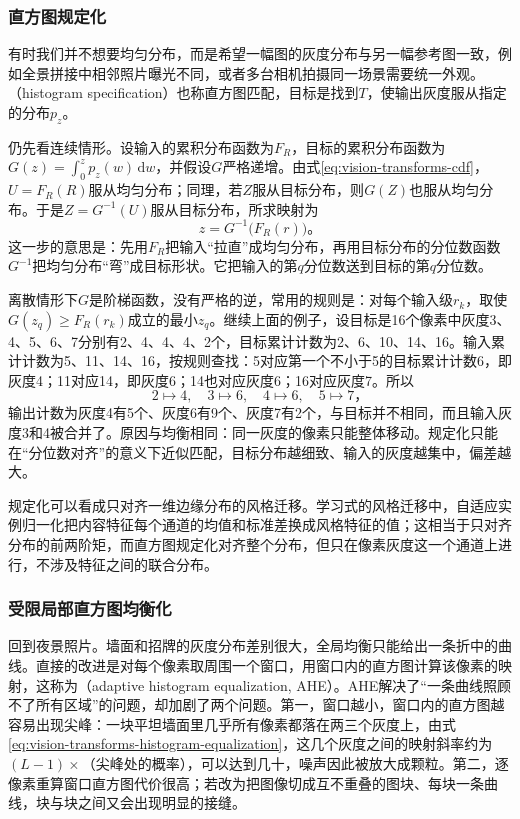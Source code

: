 \subsubsection{直方图规定化}

有时我们并不想要均匀分布，而是希望一幅图的灰度分布与另一幅参考图一致，例如全景拼接中相邻照片曝光不同，或者多台相机拍摄同一场景需要统一外观。（histogram specification）也称直方图匹配，目标是找到$T$，使输出灰度服从指定的分布$p_z$。

仍先看连续情形。设输入的累积分布函数为$F_R$，目标的累积分布函数为$G(z)=\int_0^zp_z(w)\,\mathrm{d}w$，并假设$G$严格递增。由式\eqref{eq:vision-transforms-cdf}，$U=F_R(R)$服从均匀分布；同理，若$Z$服从目标分布，则$G(Z)$也服从均匀分布。于是$Z=G^{-1}(U)$服从目标分布，所求映射为
\begin{equation}
  z=G^{-1}\bigl(F_R(r)\bigr)\text{。}
  \label{eq:vision-transforms-specification}
\end{equation}
这一步的意思是：先用$F_R$把输入“拉直”成均匀分布，再用目标分布的分位数函数$G^{-1}$把均匀分布“弯”成目标形状。它把输入的第$q$分位数送到目标的第$q$分位数。

离散情形下$G$是阶梯函数，没有严格的逆，常用的规则是：对每个输入级$r_k$，取使$G(z_q)\geq F_R(r_k)$成立的最小$z_q$。继续上面的例子，设目标是16个像素中灰度3、4、5、6、7分别有2、4、4、4、2个，目标累计计数为2、6、10、14、16。输入累计计数为5、11、14、16，按规则查找：5对应第一个不小于5的目标累计计数6，即灰度4；11对应14，即灰度6；14也对应灰度6；16对应灰度7。所以
\[
  2\mapsto4,\quad 3\mapsto6,\quad 4\mapsto6,\quad 5\mapsto7\text{，}
\]
输出计数为灰度4有5个、灰度6有9个、灰度7有2个，与目标并不相同，而且输入灰度3和4被合并了。原因与均衡相同：同一灰度的像素只能整体移动。规定化只能在“分位数对齐”的意义下近似匹配，目标分布越细致、输入的灰度越集中，偏差越大。

规定化可以看成只对齐一维边缘分布的风格迁移。学习式的风格迁移中，自适应实例归一化把内容特征每个通道的均值和标准差换成风格特征的值；这相当于只对齐分布的前两阶矩，而直方图规定化对齐整个分布，但只在像素灰度这一个通道上进行，不涉及特征之间的联合分布。

\subsubsection{受限局部直方图均衡化}
\label{sec:vision-transforms-clahe}

回到夜景照片。墙面和招牌的灰度分布差别很大，全局均衡只能给出一条折中的曲线。直接的改进是对每个像素取周围一个窗口，用窗口内的直方图计算该像素的映射，这称为（adaptive histogram equalization, AHE）。AHE解决了“一条曲线照顾不了所有区域”的问题，却加剧了两个问题。第一，窗口越小，窗口内的直方图越容易出现尖峰：一块平坦墙面里几乎所有像素都落在两三个灰度上，由式\eqref{eq:vision-transforms-histogram-equalization}，这几个灰度之间的映射斜率约为$(L-1)\times$（尖峰处的概率），可以达到几十，噪声因此被放大成颗粒。第二，逐像素重算窗口直方图代价很高；若改为把图像切成互不重叠的图块、每块一条曲线，块与块之间又会出现明显的接缝。

